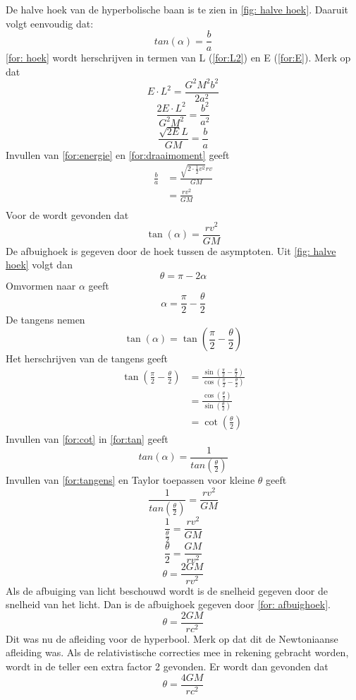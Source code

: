 De halve hoek van de hyperbolische baan is te zien in \cref{fig: halve hoek}. Daaruit volgt eenvoudig dat:
\begin{equation}
    tan(\alpha) = \frac{b}{a}
    \label{for: hoek}
\end{equation}
\cref{for: hoek} wordt herschrijven in termen van L (\cref{for:L2}) en E (\cref{for:E}).
Merk op dat
$$E\cdot L^{2}=\frac{G^{2}M^{2}b^{2}}{2a^{2}}$$
$$\frac{2E\cdot L^{2}}{G^{2}M^{2}}=\frac{b^{2}}{a^{2}}$$
$$\frac{\sqrt{2E}L}{GM}=\frac{b}{a}$$
Invullen van \cref{for:energie} en \cref{for:draaimoment} geeft
\begin{align}
    \frac{b}{a}&=\frac{\sqrt{2\cdot\frac{1}{2}v^{2}}rv}{GM}\nonumber \\
     &= \frac{rv^{2}}{GM}\nonumber\\
\end{align}
Voor de wordt gevonden dat
\begin{equation}
    \tan(\alpha) =\frac{rv^{2}}{GM} 
    \label{for:tangens}
\end{equation}
De afbuighoek is gegeven door de hoek tussen de asymptoten. Uit \cref{fig: halve hoek} volgt dan
$$\theta = \pi - 2\alpha$$
Omvormen naar $\alpha$ geeft
$$\alpha = \frac{\pi}{2}-\frac{\theta}{2}$$
De tangens nemen
\begin{equation}
    \tan(\alpha) = \tan\left(\frac{\pi}{2}-\frac{\theta}{2}\right)
    \label{for:tan}
\end{equation}
Het herschrijven van de tangens geeft
\begin{align}
    \tan\left(\frac{\pi}{2}-\frac{\theta}{2}\right)&=\frac{\sin(\frac{\pi}{2}-\frac{\theta}{2})}{\cos(\frac{\pi}{2}-\frac{\theta}{2})}\nonumber\\
    &= \frac{\cos(\frac{\theta}{2})}{\sin(\frac{\theta}{2})}\nonumber \\
    & = \cot(\frac{\theta}{2})
    \label{for:cot}
\end{align}
Invullen van \cref{for:cot} in \cref{for:tan} geeft
\begin{equation}
    tan(\alpha) = \frac{1}{tan(\frac{\theta}{2})}
    \label{for:afbuighoek}
\end{equation}
Invullen van \cref{for:tangens} en Taylor toepassen voor kleine $\theta$ geeft
$$\frac{1}{tan(\frac{\theta}{2})} = \frac{rv^{2}}{GM}$$
$$\frac{1}{\frac{\theta}{2}}=\frac{rv^{2}}{GM}$$
$$\frac{\theta}{2} = \frac{GM}{rv^{2}}$$
$$\theta = \frac{2GM}{rv^{2}}$$
Als de afbuiging van licht beschouwd wordt is de snelheid gegeven door de snelheid van het licht. Dan is de afbuighoek gegeven door \cref{for: afbuighoek}.
\begin{equation}
    \theta = \frac{2GM}{rc^{2}}
    \label{for: afbuighoek}
\end{equation}
Dit was nu de afleiding voor de hyperbool. Merk op dat dit de Newtoniaanse afleiding was. Als de relativistische correcties mee in rekening gebracht worden, wordt in de teller een extra factor 2 gevonden. Er wordt dan gevonden dat
$$\theta=\frac{4GM}{rc^{2}}$$
